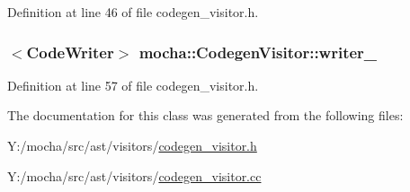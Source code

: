 Definition at line 46 of file codegen\_\-visitor.h.

\hypertarget{classmocha_1_1_codegen_visitor_ad497faaa804159b3beecec28583a10fb}{
\subsubsection[{writer\_\-}]{$<${\bf CodeWriter}$>$ {\bf mocha::CodegenVisitor::writer\_\-}}}
\label{classmocha_1_1_codegen_visitor_ad497faaa804159b3beecec28583a10fb}


Definition at line 57 of file codegen\_\-visitor.h.



The documentation for this class was generated from the following files:\begin{DoxyCompactItemize}
\item 
Y:/mocha/src/ast/visitors/\hyperlink{codegen__visitor_8h}{codegen\_\-visitor.h}\item 
Y:/mocha/src/ast/visitors/\hyperlink{codegen__visitor_8cc}{codegen\_\-visitor.cc}\end{DoxyCompactItemize}
